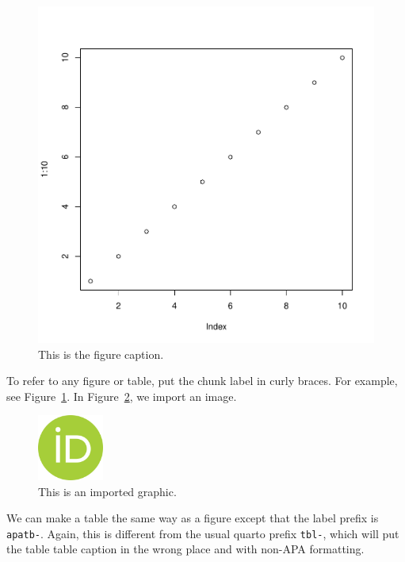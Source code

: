 \documentclass[
  man,
  colorlinks=true,linkcolor=blue,citecolor=blue,urlcolor=blue]{apa7}
\begin{document}
\begin{figure}[h!]
\caption{This is the figure caption.}
\label{apafg-myplot}
\includegraphics[width=6.5 in]{mazzardo23_files/figure-pdf/apafg-myplot-1.pdf}




\end{figure}

To refer to any figure or table, put the chunk label in curly braces.
For example, see Figure~\ref{apafg-myplot}. In
Figure~\ref{apafg-importedgraphic}, we import an image.

\begin{figure}[h!]
\caption{This is an imported graphic.}
\label{apafg-importedgraphic}
\includegraphics[width=0.85in]{orcid.png}




\end{figure}

We can make a table the same way as a figure except that the label
prefix is \texttt{apatb-}. Again, this is different from the usual
quarto prefix \texttt{tbl-}, which will put the table table caption in
the wrong place and with non-APA formatting.
\end{document}
